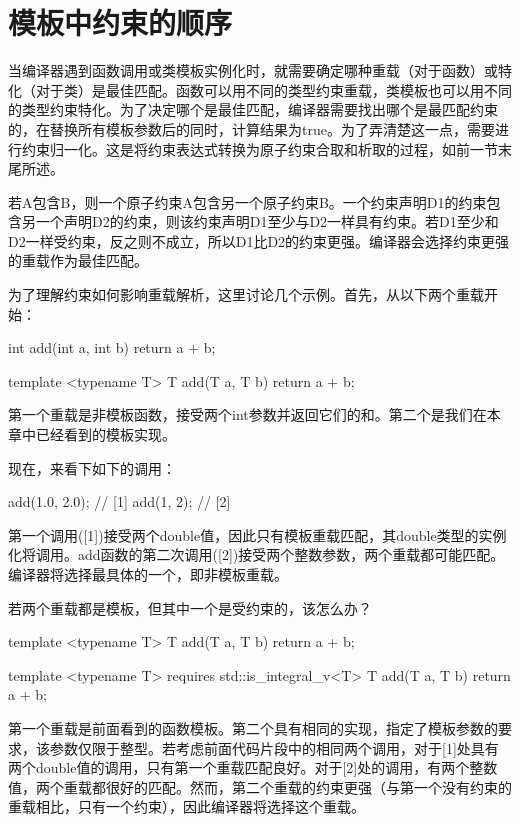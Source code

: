 \section{模板中约束的顺序}
当编译器遇到函数调用或类模板实例化时，就需要确定哪种重载（对于函数）或特化（对于类）是最佳匹配。函数可以用不同的类型约束重载，类模板也可以用不同的类型约束特化。为了决定哪个是最佳匹配，编译器需要找出哪个是最匹配约束的，在替换所有模板参数后的同时，计算结果为true。为了弄清楚这一点，需要进行约束归一化。这是将约束表达式转换为原子约束合取和析取的过程，如前一节末尾所述。

若A包含B，则一个原子约束A包含另一个原子约束B。一个约束声明D1的约束包含另一个声明D2的约束，则该约束声明D1至少与D2一样具有约束。若D1至少和D2一样受约束，反之则不成立，所以D1比D2的约束更强。编译器会选择约束更强的重载作为最佳匹配。

为了理解约束如何影响重载解析，这里讨论几个示例。首先，从以下两个重载开始：

\begin{cpp}
int add(int a, int b)
{
	return a + b;
}

template <typename T>
T add(T a, T b)
{
	return a + b;
}
\end{cpp}

第一个重载是非模板函数，接受两个int参数并返回它们的和。第二个是我们在本章中已经看到的模板实现。

现在，来看下如下的调用：

\begin{cpp}
add(1.0, 2.0); // [1]
add(1, 2); // [2]
\end{cpp}

第一个调用([1])接受两个double值，因此只有模板重载匹配，其double类型的实例化将调用。add函数的第二次调用([2])接受两个整数参数，两个重载都可能匹配。编译器将选择最具体的一个，即非模板重载。

若两个重载都是模板，但其中一个是受约束的，该怎么办？

\begin{cpp}
template <typename T>
T add(T a, T b)
{
	return a + b;
}

template <typename T>
requires std::is_integral_v<T>
T add(T a, T b)
{
	return a + b;
}
\end{cpp}

第一个重载是前面看到的函数模板。第二个具有相同的实现，指定了模板参数的要求，该参数仅限于整型。若考虑前面代码片段中的相同两个调用，对于[1]处具有两个double值的调用，只有第一个重载匹配良好。对于[2]处的调用，有两个整数值，两个重载都很好的匹配。然而，第二个重载的约束更强（与第一个没有约束的重载相比，只有一个约束），因此编译器将选择这个重载。

